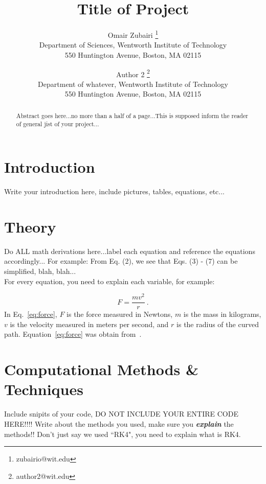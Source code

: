 \documentclass[11pt]{article}
\begin{document}
\title{\textbf{Title of Project}}

\author{Omair Zubairi
\thanks{zubairio@wit.edu}\\
Department of Sciences, Wentworth Institute of Technology\\
550 Huntington Avenue, Boston, MA 02115\\
\and Author 2
\thanks{author2@wit.edu}\\
Department of whatever, Wentworth Institute of Technology\\
550 Huntington Avenue, Boston, MA 02115}

\maketitle

\begin{abstract}

Abstract goes here...no more than a half of a page...This is supposed inform
the reader of general jist of your project...

\end{abstract}


\section{Introduction}
\noindent Write your introduction here, include pictures, tables, equations, etc...

\section{Theory}
\noindent Do ALL math derivations here...label each equation and reference the
equations accordingly... For example:  From Eq. (2), we see that Eqs. (3) - (7) 
can be simplified, blah, blah...\\

\noindent For every equation, you need to explain each variable, for example:

\begin{equation}
\label{eq:force}
F=\dfrac{mv^2}{r}~.
\end{equation}
\noindent In Eq.~\eqref{eq:force}, $F$ is the force measured in Newtons, $m$ is the
mass in kilograms, $v$ is the velocity measured in meters per second, and $r$ is
the radius of the curved path.  Equation~\eqref{eq:force} was obtain from~\cite{uni}.


\section{Computational Methods \& Techniques}
\noindent Include snipits of your code, DO NOT INCLUDE YOUR ENTIRE CODE HERE!!!!  
Write about the methods you used, make sure you \textbf{\textit{explain}} the methods!!  Don't
just say we used ``RK4", you need to explain what is RK4.
\end{document}
